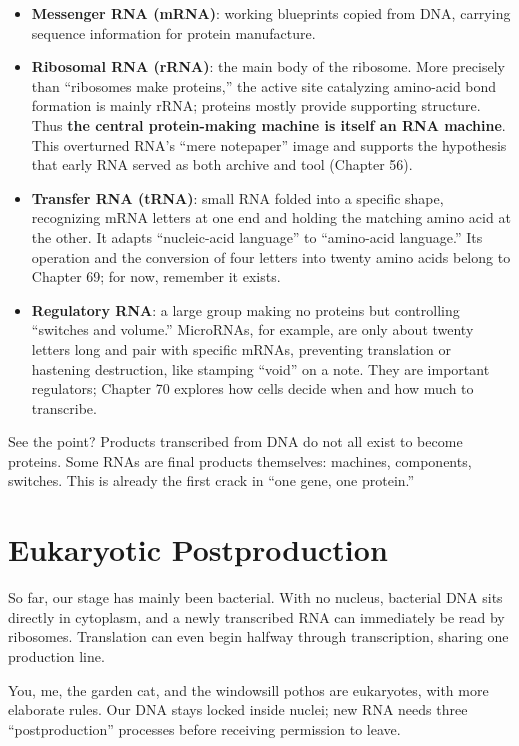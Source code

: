 \begin{itemize}[itemsep=2pt]
\item \textbf{Messenger RNA (mRNA)}: working blueprints copied from DNA, carrying sequence information for protein manufacture.
\item \textbf{Ribosomal RNA (rRNA)}: the main body of the ribosome. More precisely than ``ribosomes make proteins,'' the active site catalyzing amino-acid bond formation is mainly rRNA; proteins mostly provide supporting structure. Thus \textbf{the central protein-making machine is itself an RNA machine}. This overturned RNA's ``mere notepaper'' image and supports the hypothesis that early RNA served as both archive and tool (Chapter 56).
\item \textbf{Transfer RNA (tRNA)}: small RNA folded into a specific shape, recognizing mRNA letters at one end and holding the matching amino acid at the other. It adapts ``nucleic-acid language'' to ``amino-acid language.'' Its operation and the conversion of four letters into twenty amino acids belong to Chapter 69; for now, remember it exists.
\item \textbf{Regulatory RNA}: a large group making no proteins but controlling ``switches and volume.'' MicroRNAs, for example, are only about twenty letters long and pair with specific mRNAs, preventing translation or hastening destruction, like stamping ``void'' on a note. They are important regulators; Chapter 70 explores how cells decide when and how much to transcribe.
\end{itemize}

See the point? Products transcribed from DNA do not all exist to become proteins. Some RNAs are final products themselves: machines, components, switches. This is already the first crack in ``one gene, one protein.''

\section{Eukaryotic Postproduction}

So far, our stage has mainly been bacterial. With no nucleus, bacterial DNA sits directly in cytoplasm, and a newly transcribed RNA can immediately be read by ribosomes. Translation can even begin halfway through transcription, sharing one production line.

You, me, the garden cat, and the windowsill pothos are eukaryotes, with more elaborate rules. Our DNA stays locked inside nuclei; new RNA needs three ``postproduction'' processes before receiving permission to leave.

